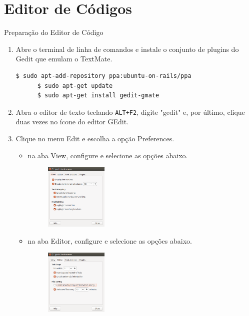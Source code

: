 \section{Editor de Códigos}
\begin{frame}{Preparação do Editor de Código}
  \begin{enumerate}
    
    \item Abre o terminal de linha de comandos e instale o conjunto de plugins do Gedit 
      que emulam o TextMate.
    \begin{lstlisting}[style=BashInputStyle]
      $ sudo apt-add-repository ppa:ubuntu-on-rails/ppa
      $ sudo apt-get update
      $ sudo apt-get install gedit-gmate
    \end{lstlisting}
    
    \item Abra o editor de texto teclando \verb!ALT+F2!, digite "gedit" e, por último,
      clique duas vezes no ícone do editor \alert{GEdit}.
    
    
    \item Clique no menu \alert{Edit} e escolha a opção \alert{Preferences}.
    \begin{itemize}
      \item na aba \alert{View}, configure e selecione as opções abaixo.
      \begin{figure}[h!]
	\centering
	\includegraphics[width=0.30\textwidth]{devops/imagens/gedit-1.png}
      \end{figure}
    \end{itemize}

    \framebreak
    \begin{itemize}
      \item na aba \alert{Editor}, configure e selecione as opções abaixo.
      \begin{figure}[h!]
	\centering
	\includegraphics[width=0.30\textwidth]{devops/imagens/gedit-2.png}
      \end{figure}
    \end{itemize}


\end{enumerate}
\end{frame}
